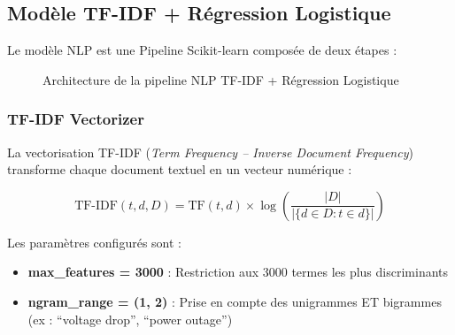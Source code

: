\documentclass[1pt,a4paper]{report}
\begin{document}
\subsection{Mod\`{e}le TF-IDF + R\'{e}gression Logistique}

Le mod\`{e}le NLP est une Pipeline Scikit-learn compos\'{e}e de deux \'{e}tapes :

\begin{figure}[H]
\centering
{}
\caption{Architecture de la pipeline NLP TF-IDF + R\'{e}gression Logistique}
\label{fig:nlp_arch}
\end{figure}

\subsubsection{TF-IDF Vectorizer}

La vectorisation TF-IDF (\textit{Term Frequency -- Inverse Document Frequency}) transforme chaque document textuel en un vecteur num\'{e}rique :

\begin{equation}
  \text{TF-IDF}(t, d, D) = \text{TF}(t, d) \times \log\!\left(\frac{|D|}{|\{d \in D : t \in d\}|}\right)
  \label{eq:tfidf}
\end{equation}

Les param\`{e}tres configur\'{e}s sont :
\begin{itemize}
  \item \textbf{max\_features = 3000} : Restriction aux 3000 termes les plus discriminants
  \item \textbf{ngram\_range = (1, 2)} : Prise en compte des unigrammes ET bigrammes (ex : ``voltage drop'', ``power outage'')
\end{itemize}
\end{document}
